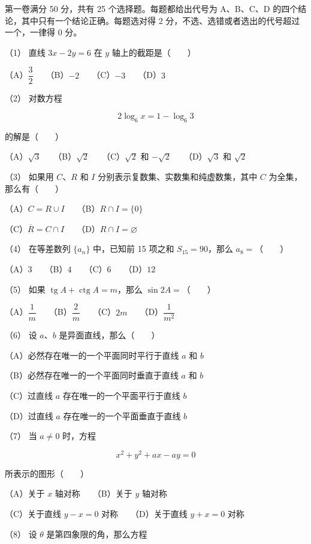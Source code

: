 \begin{question}

第一卷满分 50 分，共有 25 个选择题。每题都给出代号为 A、B、C、D 的四个结论，其中只有一个结论正确。每题选对得 2 分，不选、选错或者选出的代号超过一个，一律得 0 分。

（1） 直线 $3x-2y=6$ 在 $y$ 轴上的截距是\mbox{（　　）}

（A）$\dfrac32$　　（B）$-2$　　（C）$-3$　　（D）$3$

（2） 对数方程

\nopagebreak[4]
\[
2\log_6x=1-\log_6 3
\]

的解是\mbox{（　　）}

（A）$\sqrt3$　　（B）$\sqrt2$　　（C）$\sqrt2$ 和 $-\sqrt2$　　（D）$\sqrt3$ 和 $\sqrt2$

（3） 如果用 $C\text{、}R$ 和 $I$ 分别表示复数集、实数集和纯虚数集，其中 $C$ 为全集，那么有\mbox{（　　）}

（A）$C=R\cup I$　　（B）$R\cap I=\{0\}$

（C）$\overline R=C\cap I$　　（D）$R\cap I=\varnothing$

（4） 在等差数列 $\{a_n\}$ 中，已知前 15 项之和 $S_{15}=90$，那么 $a_8=$\mbox{（　　）}

（A）$3$　　（B）$4$　　（C）$6$　　（D）$12$

（5） 如果 $\operatorname{tg}A+\operatorname{ctg}A=m$，那么 $\sin2A=$\mbox{（　　）}

（A）$\dfrac1m$　　（B）$\dfrac2m$　　（C）$2m$　　（D）$\dfrac1{m^2}$

（6） 设 $a\text{、}b$ 是异面直线，那么\mbox{（　　）}

（A）必然存在唯一的一个平面同时平行于直线 $a$ 和 $b$

（B）必然存在唯一的一个平面同时垂直于直线 $a$ 和 $b$

（C）过直线 $a$ 存在唯一的一个平面平行于直线 $b$

（D）过直线 $a$ 存在唯一的一个平面垂直于直线 $b$

（7） 当 $a\ne0$ 时，方程

\nopagebreak[4]
\[
x^2+y^2+ax-ay=0
\]

所表示的图形\mbox{（　　）}

（A）关于 $x$ 轴对称　　（B）关于 $y$ 轴对称

（C）关于直线 $y-x=0$ 对称　　（D）关于直线 $y+x=0$ 对称

（8） 设 $\theta$ 是第四象限的角，那么方程


\end{question}
